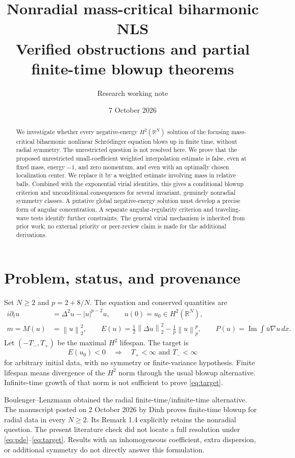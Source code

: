 \documentclass[11pt,a4paper]{article}
\title{Nonradial mass-critical biharmonic NLS\\[4pt]\large Verified obstructions and partial finite-time blowup theorems}
\author{Research working note}
\date{7 October 2026}
\theoremstyle{remark}\newtheorem{remark}[theorem]{Remark}
\newcommand{\R}{\mathbb R}
\newcommand{\dd}{\,dx}
\newcommand{\norm}[1]{\left\|#1\right\|}
\DeclareMathOperator{\Ima}{Im}
\begin{document}
\maketitle
\begin{abstract}
We investigate whether every negative-energy $H^2(\R^N)$ solution of the focusing mass-critical biharmonic nonlinear Schr\"odinger equation blows up in finite time, without radial symmetry. The unrestricted question is not resolved here. We prove that the proposed unrestricted small-coefficient weighted interpolation estimate is false, even at fixed mass, energy $-1$, and zero momentum, and even with an optimally chosen localization center. We replace it by a weighted estimate involving mass in relative balls. Combined with the exponential virial identities, this gives a conditional blowup criterion and unconditional consequences for several invariant, genuinely nonradial symmetry classes. A putative global negative-energy solution must develop a precise form of angular concentration. A separate angular-regularity criterion and traveling-wave tests identify further constraints. The general virial mechanism is inherited from prior work; no external priority or peer-review claim is made for the additional derivations.
\end{abstract}

\section{Problem, status, and provenance}
Set $N\ge2$ and $p=2+8/N$. The equation and conserved quantities are
\begin{align}
 i\partial_tu&=\Delta^2u-|u|^{p-2}u,\qquad u(0)=u_0\in H^2(\R^N),\label{eq:pde}\\
 m=M(u)&=\norm{u}_2^2,\qquad
 E(u)=\frac12\norm{\Delta u}_2^2-\frac1p\norm{u}_p^p,\qquad
 P(u)=\Ima\int\bar u\nabla u\dd.\label{eq:energy}
\end{align}
Let $(-T_-,T_+)$ be the maximal $H^2$ lifespan. The target is
\begin{equation}\label{eq:target}
 E(u_0)<0\quad\Longrightarrow\quad T_+<\infty\text{ and }T_-<\infty
\end{equation}
for arbitrary initial data, with no symmetry or finite-variance hypothesis. Finite lifespan means divergence of the $H^2$ norm through the usual blowup alternative. Infinite-time growth of that norm is not sufficient to prove \eqref{eq:target}.

Boulenger--Lenzmann \cite{BL} obtained the radial finite-time/infinite-time alternative. The manuscript posted on 2 October 2026 by Dinh \cite{Dinh} proves finite-time blowup for radial data in every $N\ge2$. Its Remark 1.4 explicitly retains the nonradial question. The present literature check did not locate a full resolution under \eqref{eq:pde}--\eqref{eq:target}. Results with an inhomogeneous coefficient, extra dispersion, or additional symmetry do not directly answer this formulation.
\end{document}
